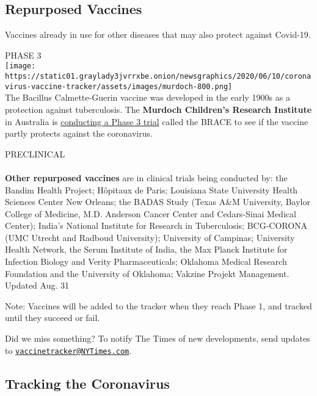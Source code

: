 \hypertarget{repurposed-vaccines}{%
\subsection{Repurposed Vaccines}\label{repurposed-vaccines}}

Vaccines already in use for other diseases that may also protect against
Covid-19.

PHASE 3\\
\texttt{[image: https://static01.graylady3jvrrxbe.onion/newsgraphics/2020/06/10/coronavirus-vaccine-tracker/assets/images/murdoch-800.png]}\\
The Bacillus Calmette-Guerin vaccine was developed in the early 1900s as
a protection against tuberculosis. The \textbf{Murdoch Children's
Research Institute} in Australia is
\href{https://www.nytimes3xbfgragh.onion/2020/04/03/health/coronavirus-bcg-vaccine.html}{conducting
a Phase 3 trial} called the BRACE to see if the vaccine partly protects
against the coronavirus.

PRECLINICAL\\
~\\
 \textbf{Other repurposed vaccines} are in clinical trials being
conducted by: the Bandim Health Project; Hôpitaux de Paris; Louisiana
State University Health Sciences Center New Orleans; the BADAS Study
(Texas A\&M University, Baylor College of Medicine, M.D. Anderson Cancer
Center and Cedars-Sinai Medical Center); India's National Institute for
Research in Tuberculosis; BCG-CORONA (UMC Utrecht and Radboud
University); University of Campinas; University Health Network, the
Serum Institute of India, the Max Planck Institute for Infection Biology
and Verity Pharmaceuticals; Oklahoma Medical Research Foundation and the
University of Oklahoma; Vakzine Projekt Management.\\
Updated Aug. 31

Note: Vaccines will be added to the tracker when they reach Phase 1, and
tracked until they succeed or fail.

Did we miss something? To notify The Times of new developments, send
updates to
\href{mailto:vaccinetracker@NYTimes.com}{\nolinkurl{vaccinetracker@NYTimes.com}}.

\hypertarget{tracking-the-coronavirus}{%
\subsection{Tracking the Coronavirus}\label{tracking-the-coronavirus}}

